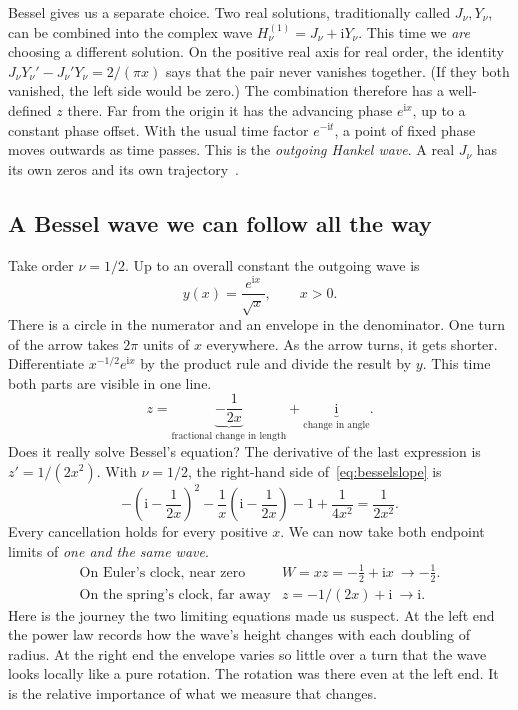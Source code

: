 \documentclass[11pt,a4paper]{amsart}
\newcommand{\ii}{\mathrm{i}}
\theoremstyle{definition}
\theoremstyle{remark}
\begin{document}
Bessel gives us a separate choice. Two real solutions, traditionally called \(J_\nu,Y_\nu\), can be combined into the complex wave \(H^{(1)}_\nu=J_\nu+\ii Y_\nu\). This time we \emph{are} choosing a different solution. On the positive real axis for real order, the identity \(J_\nu Y_\nu'-J_\nu'Y_\nu=2/(\pi x)\) says that the pair never vanishes together. (If they both vanished, the left side would be zero.) The combination therefore has a well-defined \(z\) there. Far from the origin it has the advancing phase \(e^{\ii x}\), up to a constant phase offset. With the usual time factor \(e^{-\ii t}\), a point of fixed phase moves outwards as time passes. This is the \emph{outgoing Hankel wave}. A real \(J_\nu\) has its own zeros and its own trajectory~\cite{NISTBessel}.

\subsection{A Bessel wave we can follow all the way}
Take order \(\nu=1/2\). Up to an overall constant the outgoing wave is~\cite{NISTBessel}
\begin{equation}\label{eq:half}
 y(x)=\frac{e^{\ii x}}{\sqrt{x}},\qquad x>0 .
\end{equation}
There is a circle in the numerator and an envelope in the denominator. One turn of the arrow takes \(2\pi\) units of \(x\) everywhere. As the arrow turns, it gets shorter. Differentiate \(x^{-1/2}e^{\ii x}\) by the product rule and divide the result by \(y\). This time both parts are visible in one line.
\begin{equation}\label{eq:halfslope}
 z=\underbrace{-\frac{1}{2x}}_{\text{fractional change in length}}
      +\underbrace{\ii}_{\text{change in angle}} .
\end{equation}
Does it really solve Bessel's equation? The derivative of the last expression is \(z'=1/(2x^2)\). With \(\nu=1/2\), the right-hand side of~\eqref{eq:besselslope} is
\[
 -\left(\ii-\frac{1}{2x}\right)^2
 -\frac{1}{x}\left(\ii-\frac{1}{2x}\right)-1+\frac{1}{4x^2}
 =\frac{1}{2x^2}.
\]
Every cancellation holds for every positive \(x\). We can now take both endpoint limits of \emph{one and the same wave}.
\[
 \begin{array}{ll}
 \text{On Euler's clock, near zero}& W=xz=-\tfrac12+\ii x\ \longrightarrow-\tfrac12.\\[2pt]
 \text{On the spring's clock, far away}& z=-1/(2x)+\ii\ \longrightarrow\ii.
 \end{array}
\]
Here is the journey the two limiting equations made us suspect. At the left end the power law records how the wave's height changes with each doubling of radius. At the right end the envelope varies so little over a turn that the wave looks locally like a pure rotation. The rotation was there even at the left end. It is the relative importance of what we measure that changes.
\end{document}

